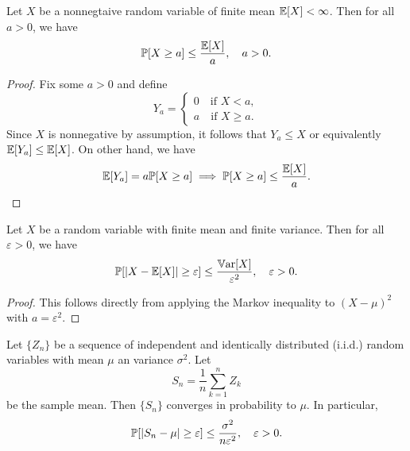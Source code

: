 \documentclass[11pt,a4paper]{article}
\begin{document}
\begin{lemma}
    Let $X$ be a nonnegtaive random variable of finite mean $\mathbb{E}[X]<\infty$. Then for all $a>0$, we have
    \begin{equation*}
        \mathbb{P}[X\ge a] \le \dfrac{\mathbb{E}[X]}{a},\quad a > 0.
    \end{equation*}
\end{lemma}

\begin{proof}
    Fix some $a > 0$ and define 
    \begin{equation*}
        Y_a = \begin{cases}
            0\quad\text{if } X<a, \\
            a\quad\text{if } X\ge a.
        \end{cases}
    \end{equation*}
    Since $X$ is nonnegative by assumption, it follows that $Y_a \le X$ or equivalently $\mathbb{E}[Y_a] \le \mathbb{E}[X]$. On other hand, we have
    \begin{equation*}
        \mathbb{E}[Y_a] = a \mathbb{P}[X \ge a] \implies \mathbb{P}[X\ge a] \le \dfrac{\mathbb{E}[X]}{a}. 
    \end{equation*}
\end{proof}

\begin{lemma}
    Let $X$ be a random variable with finite mean and finite variance. Then for all $\varepsilon>0$, we have
    \begin{equation*}
        \mathbb{P}[|X-\mathbb{E}[X]|\ge \varepsilon] \le \dfrac{\mathbb{V}\text{ar}[X]}{\varepsilon^2},\quad \varepsilon > 0.
    \end{equation*}
\end{lemma}

\begin{proof}
    This follows directly from applying the Markov inequality to $(X-\mu)^2$ with $a = \varepsilon^2$. 
\end{proof}

\begin{lemma}
    Let $\{Z_n\}$ be a sequence of independent and identically distributed (i.i.d.) random variables with mean $\mu$ an variance $\sigma^2$. Let 
    \begin{equation*}
        S_n = \dfrac{1}{n}\sum_{k=1}^n Z_k
    \end{equation*}
    be the sample mean. Then $\{S_n\}$ converges in probability to $\mu$. In particular, 
    \begin{equation*}
        \mathbb{P}[|S_n-\mu|\ge \varepsilon] \le \dfrac{\sigma^2}{n\varepsilon^2},\quad \varepsilon > 0.
    \end{equation*}
\end{lemma}
\end{document}
